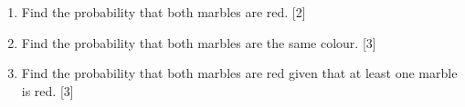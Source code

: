 \documentclass[12pt, twoside]{article}
\begin{document}
\begin{enumerate}[itemsep=0.15cm]
\begin{enumerate}[itemsep=0.1cm]
  \item Find the probability that both marbles are red. \hfill [2]
  \item Find the probability that both marbles are the same colour. \hfill [3]
  \item Find the probability that both marbles are red given that
        at least one marble is red. \hfill [3]
\end{enumerate}


\end{enumerate}
\end{document}
